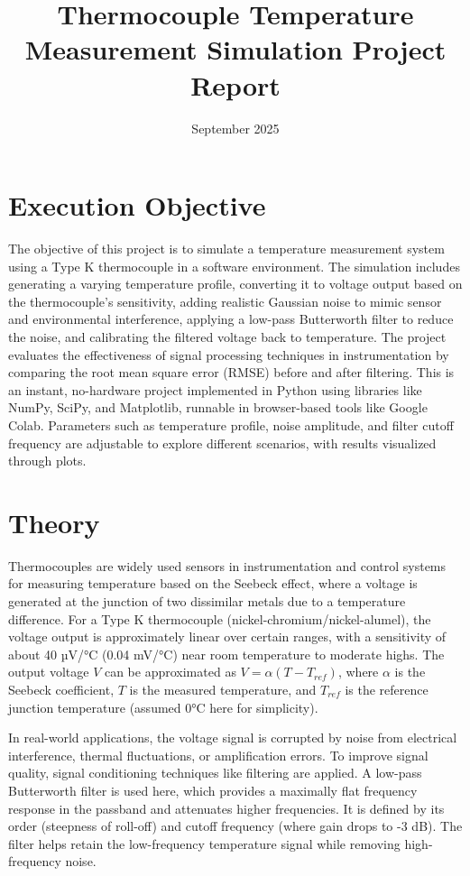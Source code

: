 \documentclass[12pt]{article}
\title{Thermocouple Temperature Measurement Simulation Project Report}
\author{}
\date{September 2025}
\begin{document}
\maketitle

\section*{Execution Objective}
The objective of this project is to simulate a temperature measurement system using a Type K thermocouple in a software environment. The simulation includes generating a varying temperature profile, converting it to voltage output based on the thermocouple's sensitivity, adding realistic Gaussian noise to mimic sensor and environmental interference, applying a low-pass Butterworth filter to reduce the noise, and calibrating the filtered voltage back to temperature. The project evaluates the effectiveness of signal processing techniques in instrumentation by comparing the root mean square error (RMSE) before and after filtering. This is an instant, no-hardware project implemented in Python using libraries like NumPy, SciPy, and Matplotlib, runnable in browser-based tools like Google Colab. Parameters such as temperature profile, noise amplitude, and filter cutoff frequency are adjustable to explore different scenarios, with results visualized through plots.

\section*{Theory}
Thermocouples are widely used sensors in instrumentation and control systems for measuring temperature based on the Seebeck effect, where a voltage is generated at the junction of two dissimilar metals due to a temperature difference. For a Type K thermocouple (nickel-chromium/nickel-alumel), the voltage output is approximately linear over certain ranges, with a sensitivity of about 40 µV/°C (0.04 mV/°C) near room temperature to moderate highs. The output voltage \( V \) can be approximated as \( V = \alpha (T - T_{ref}) \), where \( \alpha \) is the Seebeck coefficient, \( T \) is the measured temperature, and \( T_{ref} \) is the reference junction temperature (assumed 0°C here for simplicity).

In real-world applications, the voltage signal is corrupted by noise from electrical interference, thermal fluctuations, or amplification errors. To improve signal quality, signal conditioning techniques like filtering are applied. A low-pass Butterworth filter is used here, which provides a maximally flat frequency response in the passband and attenuates higher frequencies. It is defined by its order (steepness of roll-off) and cutoff frequency (where gain drops to -3 dB). The filter helps retain the low-frequency temperature signal while removing high-frequency noise.
\end{document}
